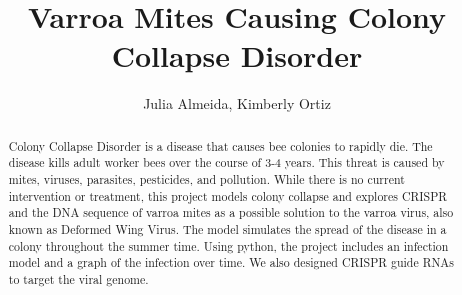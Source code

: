 \documentclass[final,5p,times,twocolumn,authoryear]{elsarticle}
\begin{document}
\begin{frontmatter}



\title{Varroa Mites Causing Colony Collapse Disorder}


\author[first]{Julia Almeida, Kimberly Ortiz}

\begin{abstract}
Colony Collapse Disorder is a disease that causes bee colonies to rapidly die. The disease kills adult worker bees over the course of 3-4 years. This threat is caused by mites, viruses, parasites, pesticides, and pollution. While there is no current intervention or treatment, this project models colony collapse and explores CRISPR and the DNA sequence of varroa mites as a possible solution to the varroa virus, also known as Deformed Wing Virus. The model simulates the spread of the disease in a colony throughout the summer time. Using python, the project includes an infection model and a graph of the infection over time. We also designed CRISPR guide RNAs to target the viral genome.


\end{abstract}
\end{frontmatter}
\end{document}

